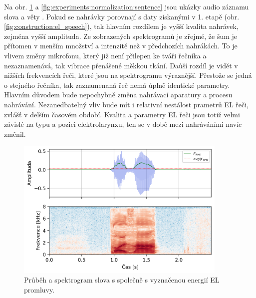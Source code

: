 Na obr. \ref{fig:experiments:normalization:word} a \ref{fig:experiments:normalization:sentence} jsou ukázky audio záznamu slova  a věty . Pokud se nahrávky porovnají s daty získanými v 1. etapě (obr. \ref{fig:construction:el_speech}), tak hlavním rozdílem je vyšší kvalita nahrávek, zejména vyšší amplituda. Ze zobrazených spektrogramů je zřejmé, že šum je přítomen v menším množství a intenzitě než v předchozích nahrákách. To je vlivem změny mikrofonu, který již není přilepen ke tváři řečníka a nezaznamenává, tak vibrace přenášené měkkou tkání. Daůší rozdíl je vidět v nižších frekvencích řeči, které jsou na spektrogramu výraznější. Přestože se jedná o stejného řečníka, tak zaznamenaná řeč nemá úplně identické parametry. Hlavním důvodem bude nepochybně změna nahrávací aparatury a procesu nahrávání. Nezanedbatelný vliv bude mít i relativní nestálost prametrů EL řeči, zvlášť v delším časovém období. Kvalita a parametry EL řeči jsou totiž velmi závislé na typu a pozici elektrolarynxu, ten se v době mezi nahráváními navíc změnil.

\begin{figure}[hbpt]
  \centering
  \includegraphics[width=0.9\textwidth]{./ch5-construction/img/energy_spec_word.png}
  \caption{Průběh a spektrogram slova  s společně s vyznačenou energií EL promluvy.}
  \label{fig:experiments:normalization:word}
\end{figure}

